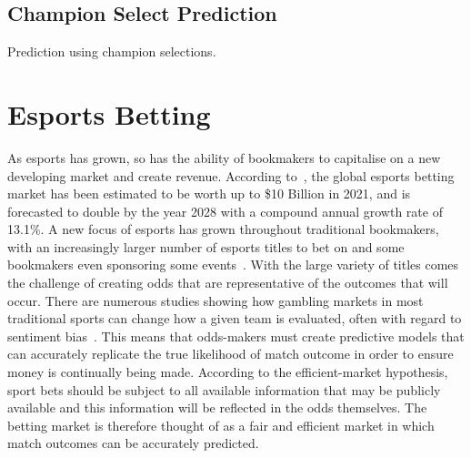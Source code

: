 \subsection{Champion Select Prediction}\label{subsec:Champion Select Prediction}
Prediction using champion selections.

\section{Esports Betting}\label{sec:Esports Betting}
As esports has grown, so has the ability of bookmakers to capitalise on a new developing market and create revenue.
According to~\citet{absolute2022esportsbet}, the global esports betting market has been estimated to be worth up to \$10 Billion in 2021, and is forecasted to double by the year 2028 with a compound annual growth rate of 13.1\%.
A new focus of esports has grown throughout traditional bookmakers, with an increasingly larger number of esports titles to bet on and some bookmakers even sponsoring some events~\citep{esportsinsider2019}.
With the large variety of titles comes the challenge of creating odds that are representative of the outcomes that will occur.
There are numerous studies showing how gambling markets in most traditional sports can change how a given team is evaluated, often with regard to sentiment bias~\citep{feddersen2018sentiment, na2019not}.
This means that odds-makers must create predictive models that can accurately replicate the true likelihood of match outcome in order to ensure money is continually being made.
According to the efficient-market hypothesis, sport bets should be subject to all available information that may be publicly available and this information will be reflected in the odds themselves\citep{even1992testing}.
The betting market is therefore thought of as a fair and efficient market in which match outcomes can be accurately predicted.\\

